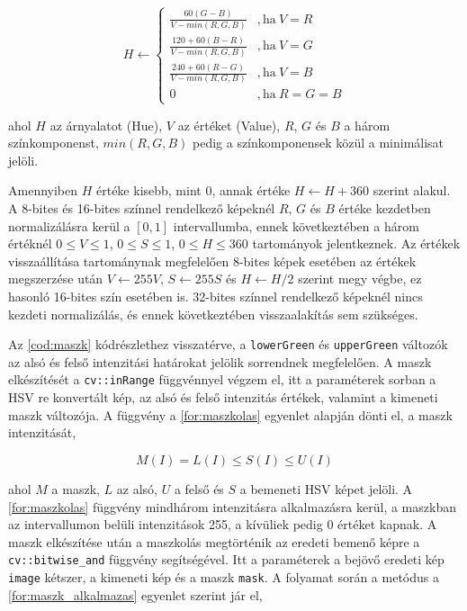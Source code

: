 \begin{equation}
    H \leftarrow
    \begin{cases}
        \frac{60(G-B)}{V-min(R,G,B)} & ,\text{ha}\ V=R \\[5pt]
        \frac{120+60(B-R)}{V-min(R,G,B)} & ,\text{ha}\ V=G \\[5pt]
        \frac{240+60(R-G)}{V-min(R,G,B)} & ,\text{ha}\ V=B \\[5pt]
        0 & ,\text{ha}\ R=G=B
    \end{cases}
    \label{for:HSV_H}
\end{equation}

\par ahol $H$ az árnyalatot (Hue), $V$ az értéket (Value), $R$, $G$ és $B$ a három színkomponenst, $min(R,G,B)$ pedig a színkomponensek közül a minimálisat jelöli.
\par Amennyiben $H$ értéke kisebb, mint $0$, annak értéke $H \leftarrow H+360$ szerint alakul. A 8-bites és 16-bites színnel rendelkező képeknél $R$, $G$ és $B$ értéke kezdetben normalizálásra kerül a $[0,1]$ intervallumba, ennek következtében a három értéknél $0 \le V \le 1$, $0 \le S \le 1$, $0 \le H \le 360$ tartományok jelentkeznek. Az értékek visszaállítása tartománynak megfelelően 8-bites képek esetében az értékek megszerzése után $V \leftarrow 255V$, $S \leftarrow 255S$ és $H \leftarrow H/2$ szerint megy végbe, ez hasonló 16-bites szín esetében is. 32-bites színnel rendelkező képeknél nincs kezdeti normalizálás, és ennek következtében visszaalakítás sem szükséges.\cite{opencv_docs}

\par Az \ref{cod:maszk} kódrészlethez visszatérve, a \lstinline{lowerGreen} és \lstinline{upperGreen} változók az alsó és felső intenzitási határokat jelölik sorrendnek megfelelően. A maszk elkészítését a \lstinline{cv::inRange} függvénnyel \cite{opencv_docs} végzem el, itt a paraméterek sorban a HSV re konvertált kép, az alsó és felső intenzitás értékek, valamint a kimeneti maszk változója.
\newline A függvény a \ref{for:maszkolas} egyenlet alapján dönti el, a maszk intenzitását,

\begin{equation}
    M(I) = L(I) \le S(I) \le U(I)
    \label{for:maszkolas}
\end{equation}

\par ahol $M$ a maszk, $L$ az alsó, $U$ a felső és $S$ a bemeneti HSV képet jelöli. A \ref{for:maszkolas} függvény mindhárom intenzitásra alkalmazásra kerül, a maszkban az intervallumon belüli intenzitások 255, a kívüliek pedig 0 értéket kapnak. A maszk elkészítése után a maszkolás megtörténik az eredeti bemenő képre a \lstinline{cv::bitwise_and} függvény \cite{opencv_docs} segítségével. Itt a paraméterek a bejövő eredeti kép \lstinline{image} kétszer, a kimeneti kép és a maszk \lstinline{mask}.
\newline A folyamat során a metódus a \ref{for:maszk_alkalmazas} egyenlet szerint jár el,


